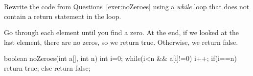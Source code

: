 \begin{requ}
Rewrite the code from Questions~\ref{exer:noZeroes} using 
a {\em while} loop that does not contain a return statement
in the loop.
\begin{requanswer}
Go through each element until you find a zero.
At the end, if we looked at the last element, there are
no zeros, so we return true. Otherwise, we return false.
\begin{code}
boolean noZeroes(int a[], int n) {
    int i=0;
    while(i<n && a[i]!=0) {
        i++;
    }
    if(i==n) {
        return true;
    } else {
        return false;
    }
}
\end{code}
\end{requanswer}
\end{requ}



